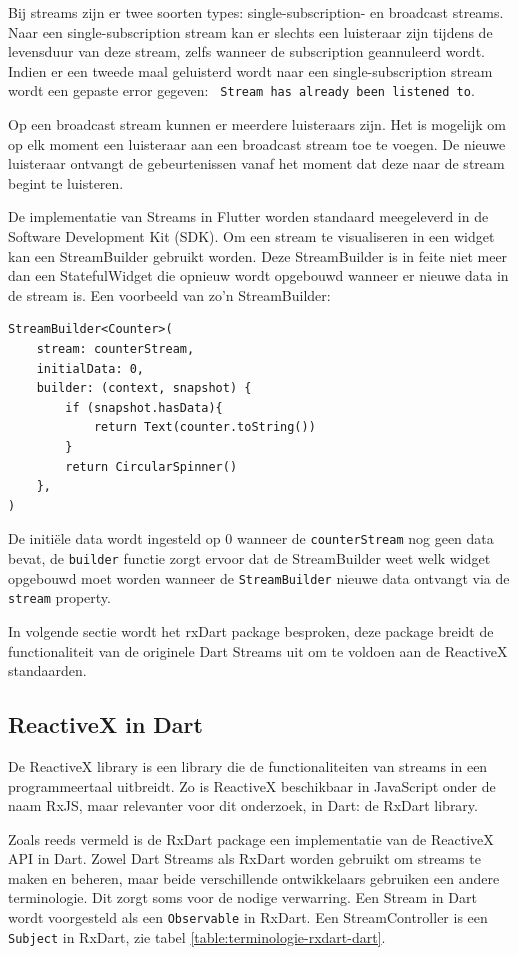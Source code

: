 Bij streams zijn er twee soorten types: single-subscription- en broadcast streams. Naar een single-subscription stream kan er slechts een luisteraar zijn tijdens de levensduur van deze stream, zelfs wanneer de subscription geannuleerd wordt. Indien er een tweede maal geluisterd wordt naar een single-subscription stream wordt een gepaste error gegeven: \verb| Stream has already been listened to|.

Op een broadcast stream kunnen er meerdere luisteraars zijn. Het is mogelijk om op elk moment een luisteraar aan een broadcast stream toe te voegen. De nieuwe luisteraar ontvangt de gebeurtenissen vanaf het moment dat deze naar de stream begint te luisteren.

De implementatie van Streams in Flutter worden standaard meegeleverd in de Software Development Kit (SDK). Om een stream te visualiseren in een widget kan een StreamBuilder gebruikt worden. Deze StreamBuilder is in feite niet meer dan een StatefulWidget die opnieuw wordt opgebouwd wanneer er nieuwe data in de stream is.
Een voorbeeld van zo'n StreamBuilder:
\begin{verbatim}
StreamBuilder<Counter>(
    stream: counterStream,
    initialData: 0,
    builder: (context, snapshot) {
        if (snapshot.hasData){
            return Text(counter.toString())
        }
        return CircularSpinner()
    },
)
\end{verbatim}
De initiële data wordt ingesteld op 0 wanneer de \verb|counterStream| nog geen data bevat, de \verb|builder| functie zorgt ervoor dat de StreamBuilder weet welk widget opgebouwd moet worden wanneer de \verb|StreamBuilder| nieuwe data ontvangt via de \verb|stream| property.

In volgende sectie wordt het rxDart package besproken, deze package breidt de functionaliteit van de originele Dart Streams uit om te voldoen aan de ReactiveX standaarden.

\subsection*{ReactiveX in Dart}
De ReactiveX library is een library die de functionaliteiten van streams in een programmeertaal uitbreidt. Zo is ReactiveX beschikbaar in JavaScript onder de naam RxJS, maar relevanter voor dit onderzoek, in Dart: de RxDart library.


Zoals reeds vermeld is de RxDart package een implementatie van de ReactiveX API in Dart. Zowel Dart Streams als RxDart worden gebruikt om streams te maken en beheren, maar beide verschillende ontwikkelaars gebruiken een andere terminologie. Dit zorgt soms voor de nodige verwarring.
Een Stream in Dart wordt voorgesteld als een \verb|Observable| in RxDart. Een StreamController is een \verb|Subject| in RxDart, zie tabel \ref{table:terminologie-rxdart-dart}.

